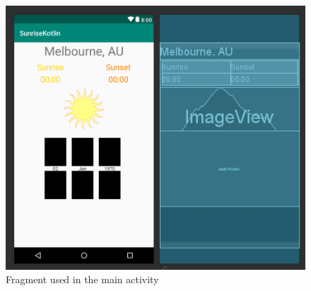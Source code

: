 \documentclass{scrartcl}
\begin{document}
\begin{figure}[h]
    \centering
    \includegraphics{images/screen7.png}
    \caption{Fragment used in the main activity}
\end{figure}
\end{document}
